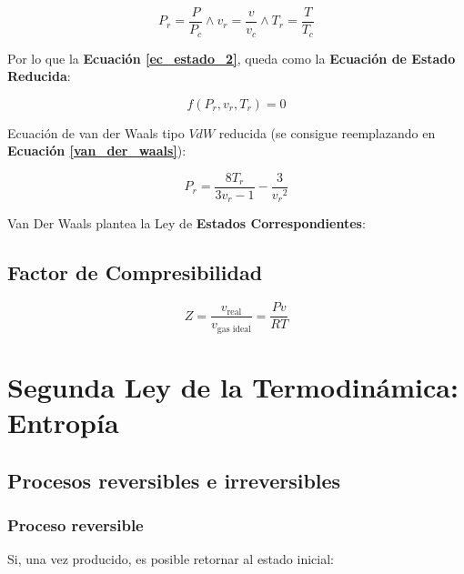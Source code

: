     \[P_{r}=\frac{P}{P_{c}} \wedge v_{r}=\frac{v}{v_{c}} \wedge T_{r}=\frac{T}{T_{c}}\]
    
    Por lo que la \textbf{Ecuación \ref{ec_estado_2}}, queda como la \textbf{Ecuación de Estado Reducida}:
    
    \begin{equation}
    \label{ec_estado_red}
        f(P_{r},v_{r},T_{r})=0
    \end{equation}
    
    Ecuación de van der Waals tipo \(VdW\) reducida (se consigue reemplazando en \textbf{Ecuación \ref{van_der_waals}}):
    
    \begin{equation}
    \label{van_der_waals_red}
        P_{r}=\frac{8T_{r}}{3v_{r}-1}-\frac{3}{{v_{r}}^{2}}
    \end{equation}
    
    Van Der Waals plantea la Ley de \textbf{Estados Correspondientes}:
    
    \begin{quote}
        \textit{}
    \end{quote}
    
    \subsection{Factor de Compresibilidad}
    
    \begin{equation}
    \label{factor_comp}
        Z=\frac{v_{\text{real}}}{v_{\text{gas ideal}}}=\frac{Pv}{RT}
    \end{equation}

\section{Segunda Ley de la Termodinámica: Entropía}

    \subsection{Procesos reversibles e irreversibles}
    
        \subsubsection{Proceso reversible}
        
        Si, una vez producido, es posible retornar al estado inicial:
        
